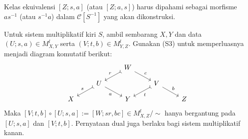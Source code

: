 Kelas ekuivalensi $[Z; s, a]$ (atau $[Z; a, s]$) harus dipahami sebagai
morfisme $as^{-1}$ (atau $s^{-1}a$) dalam $\mathcal{C}[S^{-1}]$ yang akan
dikonstruksi.

\begin{definisiproposisi}\label{prop:localized-composition}
	Untuk sistem multiplikatif kiri $S$, ambil sembarang $X,Y$ dan data
	$(U; s, a) \in M_{X,Y}^l$ serta $(V; t, b) \in M_{Y,Z}^l$. Gunakan (S3)
	untuk memperluasnya menjadi diagram komutatif berikut:
	\[\begin{tikzcd}[row sep=small]
		& & W \arrow[rightarrowtail, ld, "r"'] \arrow[rd, "c"] & & \\
		& U \arrow[rightarrowtail, ld, "s"'] \arrow[rd, "a"'] & & V \arrow[rightarrowtail, ld, "t"] \arrow[rd, "b"] & \\
		X & & Y & & Z
	\end{tikzcd}\]
	Maka
	$[V; t, b] \circ [U; s, a] := [W; sr, bc] \in M_{X,Z}^l /\sim$
	hanya bergantung pada $[U; s, a]$ dan $[V; t, b]$. Pernyataan dual juga
	berlaku bagi sistem multiplikatif kanan.
\end{definisiproposisi}
